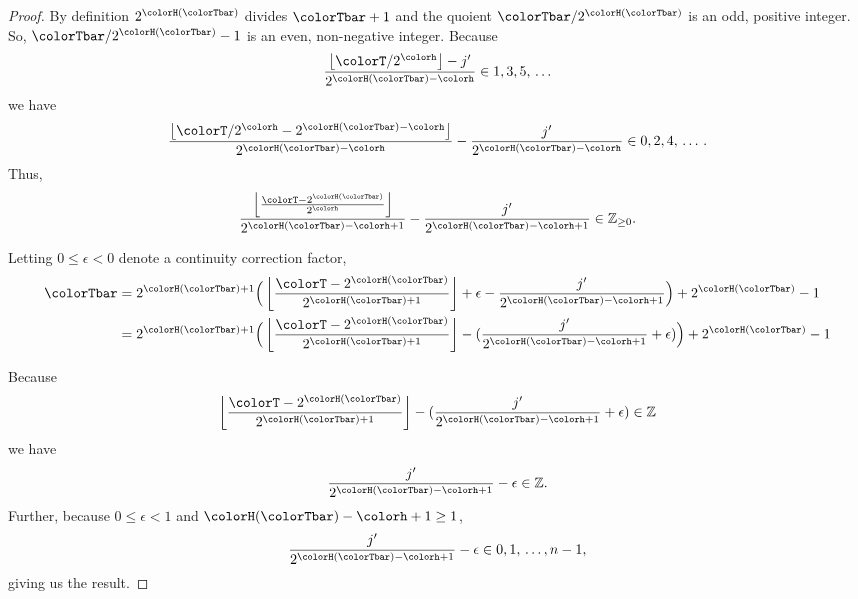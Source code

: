 \begin{proof}
By definition $2^{\colorH(\colorTbar)}$ divides $\colorTbar + 1$ and the quoient $\colorTbar / 2^{\colorH(\colorTbar)}$ is an odd, positive integer.
So, $\colorTbar / 2^{\colorH(\colorTbar)} - 1$ is an even, non-negative integer.
Because
\begin{align*}
\frac{\left\lfloor \colorT / 2^{\colorh} \right\rfloor - j'}{2^{\colorH(\colorTbar) - \colorh}} \in 1, 3, 5, \, \ldots
\end{align*}
we have
\begin{align*}
\frac{\left\lfloor \colorT / 2^{\colorh} - 2^{\colorH(\colorTbar) - \colorh} \right\rfloor}{2^{\colorH(\colorTbar) - \colorh}}
- \frac{j'}{2^{\colorH(\colorTbar) - \colorh}} \in 0, 2, 4, \, \ldots \, .
\end{align*}
Thus,
\begin{align*}
\frac{
  \left\lfloor
  \frac{\colorT - 2^{\colorH(\colorTbar)}}{2^{\colorh}}
  \right\rfloor
}{
  2^{\colorH(\colorTbar) - \colorh + 1}
}
- \frac{j'}{
  2^{\colorH(\colorTbar) - \colorh + 1}
}
\in \mathbb{Z}_{\geq0}.
\end{align*}

Letting $0 \leq \epsilon < 0$ denote a continuity correction factor,
\begin{align*}
\colorTbar
&= 2^{\colorH(\colorTbar) + 1}
\Big(
\left\lfloor
\frac{
  \colorT - 2^{\colorH(\colorTbar)}
}{
  2^{\colorH(\colorTbar) + 1}
}
\right\rfloor
+ \epsilon
- \frac{j'}{2^{\colorH(\colorTbar) - \colorh + 1}}
\Big)
+ 2^{\colorH(\colorTbar)}
- 1\\
&= 2^{\colorH(\colorTbar) + 1}
\Big(
\left\lfloor
\frac{
  \colorT - 2^{\colorH(\colorTbar)}
}{
  2^{\colorH(\colorTbar) + 1}
}
\right\rfloor
- (
  \frac{j'}{2^{\colorH(\colorTbar) - \colorh + 1}}
  + \epsilon
)
\Big)
+ 2^{\colorH(\colorTbar)}
- 1\\
\end{align*}

Because
\begin{align*}
\left\lfloor
\frac{
  \colorT - 2^{\colorH(\colorTbar)}
}{
  2^{\colorH(\colorTbar) + 1}
}
\right\rfloor
- (
\frac{j'}{2^{\colorH(\colorTbar) - \colorh + 1}}
+ \epsilon
)
\in \mathbb{Z}
\end{align*}
we have
\begin{align*}
\frac{j'}{2^{\colorH(\colorTbar) - \colorh + 1}}
- \epsilon
\in \mathbb{Z}.
\end{align*}
Further, because $0 \leq \epsilon < 1$ and $\colorH(\colorTbar) - \colorh  + 1 \geq 1$,
\begin{align*}
\frac{j'}{2^{\colorH(\colorTbar) - \colorh + 1}}
- \epsilon
\in
0, 1, \,\ldots, n - 1,
\end{align*}
giving us the result.
\end{proof}
